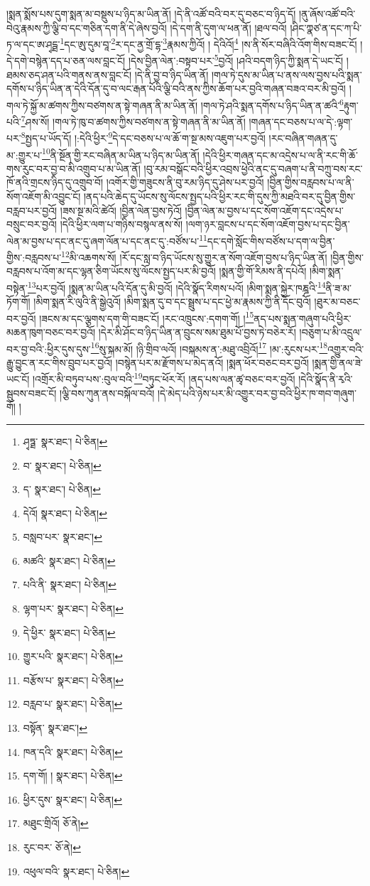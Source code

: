 །སྨན་སྨོས་པས་དུག་སྨན་མ་བསྡུས་པ་ཉིད་མ་ཡིན་ནོ། །དེ་ནི་འཚོ་བའི་བར་དུ་བཅང་བ་ཉིད་དོ། །ནུ་ཞོས་འཚོ་བའི་བེའུ་རྣམས་ཀྱི་ལྕི་བ་དང་གཅིན་དག་ནི་དེ་ཞེས་བྱའོ། །དེ་དག་ནི་དུག་ལ་ཕན་ནོ། །ཐལ་བའོ། །ཤིང་ཀྣཙ་ན་དང་ཀ་པི་ཏ་ལ་དང་ཨ་ཤྭདྠ་\footnote{ཤྭཏྠ་  སྣར་ཐང་།  པེ་ཅིན། }དང་ཨུ་དུམ་བཱ་\footnote{བ་  སྣར་ཐང་།  པེ་ཅིན། }ར་དང་ནྱ་གྲོ་དྷ་\footnote{ད་  སྣར་ཐང་།  པེ་ཅིན། }རྣམས་ཀྱིའོ། །
དེའིའོ།\footnote{དེའོ།  སྣར་ཐང་།  པེ་ཅིན། } །ས་ནི་སོར་བཞིའི་འོག་གིས་བཟང་ངོ། །དེ་དགེ་བསྙེན་དད་པ་ཅན་ལས་བླང་ངོ། །དེས་བྱིན་ལེན་:བསྟབ་པར་\footnote{བསླབ་པར་  སྣར་ཐང་། }བྱའོ། །ཤའི་བདག་ཉིད་ཀྱི་སྨན་དེ་ཡང་ངོ། །ཐམས་ཅད་ཤན་པའི་གནས་ནས་བླང་ངོ། །དེ་ནི་བྱ་བ་ཉིད་ཡིན་ནོ། །གལ་ཏེ་དུས་མ་ཡིན་པ་ནས་ལས་བྱས་པའི་སྨན་དགོས་པ་ཉིད་ཡིན་ན་དེའི་དོན་དུ་བ་ལང་རྒན་པོའི་ལྕི་བའི་ནས་ཀྱིས་ཆོག་པར་བྱའི་གཞན་བཟའ་བར་མི་བྱའོ། །གལ་ཏེ་སྐྱོ་མ་ཚགས་ཀྱིས་བཙགས་ན་སྟེ་གཞན་ནི་མ་ཡིན་ནོ། །གལ་ཏེ་ཤའི་སྨན་དགོས་པ་ཉིད་ཡིན་ན་ཚའི་\footnote{མཚའི་  སྣར་ཐང་།  པེ་ཅིན། }རྟུག་པའི་\footnote{པའི་ནི་  སྣར་ཐང་།  པེ་ཅིན། }ཤས་སོ། །གལ་ཏེ་ཁུ་བ་ཚགས་ཀྱིས་བཙགས་ན་སྟེ་གཞན་ནི་མ་ཡིན་ནོ། །གཞན་དང་བཅས་པ་ལ་དེ་:ལྟག་པར་\footnote{ལྷག་པར་  སྣར་ཐང་།  པེ་ཅིན། }སྤྱད་པ་ཡོད་དོ། །:དེའི་ཕྱིར་\footnote{དེ་ཕྱིར་  སྣར་ཐང་།  པེ་ཅིན། }དེ་དང་བཅས་པ་ལ་ཆོ་ག་སྔ་མས་འཇུག་པར་བྱའོ། །རང་བཞིན་གཞན་དུ་མ་:གྱུར་པ་\footnote{གྱུར་པའི་  སྣར་ཐང་།  པེ་ཅིན། }ནི་སྔོན་གྱི་རང་བཞིན་མ་ཡིན་པ་ཉིད་མ་ཡིན་ནོ། །དེའི་ཕྱིར་གཞན་དང་མ་འདྲེས་པ་ལ་ནི་རང་གི་ཆོ་གས་རུང་བར་བྱ་བ་མི་འགྲུབ་པ་མ་ཡིན་ནོ། །བུ་རམ་བསྒོང་བའི་ཕྱིར་འབྲས་ཕྱེའི་ནང་དུ་བཞག་པ་ནི་བཀྲུ་བས་རང་ཁོ་ནའི་གྲངས་ཉིད་དུ་འགྲུབ་བོ། །འགོར་གྱི་གཟུངས་ནི་བུ་རམ་ཉིད་དུ་ཤེས་པར་བྱའོ། །བྱིན་གྱིས་བརླབས་པ་ལ་ནི་སོག་འཇོག་མི་འབྱུང་ངོ། །ནད་པའི་ཆེད་དུ་ཡོངས་སུ་ལོངས་སྤྱད་པའི་ཕྱིར་རང་གི་དུས་ཀྱི་མཐའི་བར་དུ་བྱིན་གྱིས་བརླབ་པར་བྱའོ། །ཟས་སྔ་མའི་ཚེའོ། །བྱིན་ལེན་བྱས་ཏེའོ། །བྱིན་ལེན་མ་བྱས་པ་དང་སོག་འཇོག་དང་འདྲེས་པ་བསྲུང་བར་བྱའོ། །དེའི་ཕྱིར་ལག་པ་གཉིས་བསྙལ་ནས་སོ། །ལག་ཉར་བླངས་པ་དང་སོག་འཇོག་བྱས་པ་དང་བྱིན་ལེན་མ་བྱས་པ་དང་ནང་དུ་ཞག་ལོན་པ་དང་ནང་དུ་:བཙོས་པ་\footnote{བརྩོས་པ་  སྣར་ཐང་།  པེ་ཅིན། }དང་དགེ་སློང་གིས་བཙོས་པ་དག་ལ་བྱིན་གྱིས་:བརླབས་པ་\footnote{བརླབ་པ་  སྣར་ཐང་།  པེ་ཅིན། }མི་འཆགས་སོ། །རོ་དང་སླ་བ་ཉིད་ཡོངས་སུ་གྱུར་ན་སོག་འཇོག་བྱས་པ་ཉིད་ཡིན་ནོ། །བྱིན་གྱིས་བརླབས་པ་འོག་མ་དང་ལྷན་ཅིག་ཡོངས་སུ་ལོངས་སྤྱད་པར་མི་བྱའོ། །སྨན་གྱི་གོ་རིམས་ནི་དཔེའོ། །མིག་སྨན་བསྟེན་\footnote{བསྟོན་  སྣར་ཐང་། }པར་བྱའོ། །སྨན་མ་ཡིན་པའི་དོན་དུ་མི་བྱའོ། །དེའི་སྣོད་རིགས་པའོ། །མིག་སྨན་སྐྱེར་ཁཎྜའི་\footnote{ཁན་དའི་  སྣར་ཐང་།  པེ་ཅིན། }ནི་ཟ་མ་ཏོག་གོ། །མིག་སྨན་རི་ལུའི་ནི་སྒྱེའུའོ། །མིག་སྨན་དུ་བ་དང་སྦྲུས་པ་དང་ཕྱེ་མ་རྣམས་ཀྱི་ནི་དོང་བུའོ། །ཐུར་མ་བཅང་བར་བྱའོ། །ཟངས་མ་དང་ལྕགས་དག་གི་བཟང་ངོ། །རང་འཁྲུངས་:དགག་གོ། །\footnote{དག་གོ། །  སྣར་ཐང་།  པེ་ཅིན། }ནད་པས་སྨན་གཞུག་པའི་ཕྱིར་མཆན་ཁུག་བཅང་བར་བྱའོ། །དེར་མི་ཤོང་བ་ཉིད་ཡིན་ན་བྲུངས་སམ་ཐུམ་པོ་བྱས་ཏེ་བཅེར་རོ། །བཅུག་པ་མི་འདྲུལ་བར་བྱ་བའི་:ཕྱིར་དུས་དུས་\footnote{ཕྱིར་དུས་  སྣར་ཐང་།  པེ་ཅིན། }སུ་སྐམ་མོ། །ཉི་གྲིབ་ལའོ། །བསྐམས་ན་:མཐུ་འབྲིའོ།\footnote{མཐུང་གྲིའོ།  ཅོ་ནེ། } །མ་:རུངས་པར་\footnote{རུང་བར་  ཅོ་ནེ། }འགྱུར་བའི་རྒྱུ་བྱུང་ན་རང་གིས་བྲུབ་པར་བྱའོ། །བསྙེན་པར་མ་རྫོགས་པ་མེད་ནའོ། །སྨན་ཕོར་བཅང་བར་བྱའོ། །སྨན་གྱི་ནལ་ཟེ་ཡང་ངོ། །འགྲོར་མི་བཏུབ་པས་:བུལ་བའི་\footnote{འཕུལ་བའི་  སྣར་ཐང་།  པེ་ཅིན། }བཏུང་ཕོར་རོ། །ནད་པས་ལན་ཚྭ་བཅང་བར་བྱའོ། །དེའི་སྣོད་ནི་རྭའི་སྦུབས་བཟང་ངོ། །ལྕི་བས་ཀུན་ནས་བསྐོལ་བའོ། །དེ་མེད་པའི་ཉེས་པར་མི་འགྱུར་བར་བྱ་བའི་ཕྱིར་ཁ་གབ་གཞུག་གོ། །
